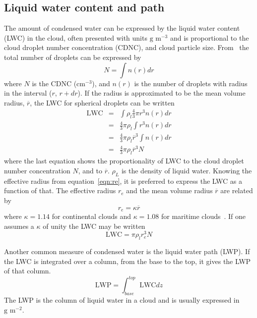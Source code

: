 \subsection{Liquid water content and path}
\label{sec:lwc}
The amount of condensed water can be expressed by the liquid water content (LWC) in the cloud, often presented with units $\text{g~m}^{-3}$ and is proportional to the cloud droplet number concentration (CDNC), and cloud particle size. From~\citet{Rogers1989} the total number of droplets can be expressed by
\begin{equation}
N = \int n(r) dr
\end{equation}
where $N$ is the CDNC ($\text{cm}^{-3}$), and $n(r)$ is the number of droplets with radius in the interval ($r$, $r + dr$). If the radius is approximated to be the mean volume radius, $\overline{r}$, the LWC for spherical droplets can be written
\begin{eqnarray}
\text{LWC} &=& \int \rho_l \frac{4}{3} \pi r^3 n(r) dr\\
&=& \frac{4}{3} \pi \rho_l \int r^3 n(r) dr\\
&=& \frac{4}{3} \pi \rho_l \overline{r}^3 \int n(r) dr\\
&=& \frac{4}{3} \pi \rho_l \overline{r}^3 N 
\end{eqnarray}
where the last equation shows the proportionality of LWC to the cloud droplet number concentration $N$, and to $\overline{r}$. $\rho_L$ is the density of liquid water. Knowing the effective radius from equation~\ref{eqn:re}, it is preferred to express the LWC as a function of that. The effective radius $r_e$ and the mean volume radius $\overline{r}$ are related by
\begin{equation}
r_e = \kappa \overline{r}
\end{equation}
where $\kappa = 1.14$ for continental clouds and $\kappa = 1.08$ for maritime clouds~\citep{Martin1994}. If one assumes a $\kappa$ of unity the LWC may be written
\begin{equation}
\text{LWC} = \pi \rho_l r_e^3 N
\label{eqn:LWC}
\end{equation}

Another common measure of condensed water is the liquid water path (LWP).
If the LWC is integrated over a column, from the base to the top, it gives the LWP of that column.
\begin{equation}
\text{LWP} = \int_{base}^{top} \text{LWC} dz
\end{equation}
The LWP is the column of liquid water in a cloud and is usually expressed in $\text{g~m}^{-2}$.

